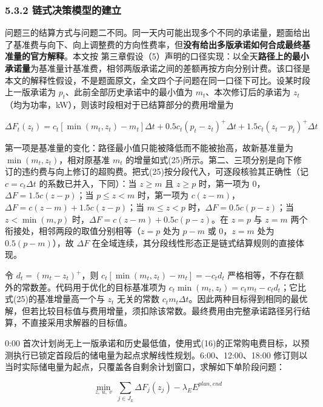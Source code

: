 \documentclass[12pt,a4paper]{ctexart}
\begin{document}
\subsubsection*{5.3.2 链式决策模型的建立}

问题三的结算方式与问题二不同。同一天内可能出现多个不同的承诺量，题面给出了基准费与向下、向上调整费的方向性费率，但\textbf{没有给出多版承诺如何合成最终基准量的官方解释}。本文按 第三章假设（5）声明的口径实现：以全天\textbf{路径上的最小承诺量}为基准量计基准费，相邻两版承诺之间的差额再按方向分别计费。该口径是本文的解释性假设，不是题面原文，全文四个子问题在同一口径下可比。设某时段上一版承诺为 $p_t$、此前全部历史承诺中的最小值为 $m_t$、本次修订后的承诺为 $z_t$（均为功率，kW），则该时段相对于已结算部分的费用增量为

\begin{equation}
\Delta F_t(z_t)=c_t\left[\min(m_t,z_t)-m_t\right]\Delta t+0.5c_t\left(p_t-z_t\right)^{+}\Delta t+1.5c_t\left(z_t-p_t\right)^{+}\Delta t
\end{equation}

第一项是基准量的变化：路径最小值只能被降低而不能被抬高，故新基准量为 $\min(m_t,z_t)$，相对原基准 $m_t$ 的增量如式(25)所示。第二、三项分别是向下修订的违约费与向上修订的超购费。把式(25)按分段代入，可逐段核验其正确性（记 $c=c_t\Delta t$ 的系数已并入，下同）：当 $z\ge m$ 且 $z\ge p$ 时，第一项为 0，$\Delta F=1.5c(z-p)$；当 $p\le z<m$ 时，第一项为 $c(z-m)$，$\Delta F=c(z-m)+1.5c(z-p)$；当 $m\le z<p$ 时，$\Delta F=0.5c(p-z)$；当 $z<\min(m,p)$ 时，$\Delta F=c(z-m)+0.5c(p-z)$。在 $z=p$ 与 $z=m$ 两个衔接处，相邻两段的取值分别相等（$z=p$ 处为 $p-m$ 或 0，$z=m$ 处为 $0.5(p-m)$），故 $\Delta F$ 在全域连续，其分段线性形态正是链式结算规则的直接体现。

令 $d_t=(m_t-z_t)^+$，则 $c_t[\min(m_t,z_t)-m_t]=-c_t d_t$ 严格相等，不存在额外的常数差。代码用于优化的目标基准项为 $c_t\min(m_t,z_t)=c_t m_t-c_t d_t$；它比式(25)的基准增量高一个与 $z_t$ 无关的常数 $c_t m_t\Delta t$。因此两种目标得到相同的最优解，但若比较目标值与费用增量，须扣除该常数。最终费用由完整承诺路径另行结算，不直接采用求解器的目标值。

0:00 首次计划尚无上一版承诺和历史最低值，使用式(16)的正常购电费目标，以预测执行已锁定首段后的储电量为起点求解线性规划。6:00、12:00、18:00 修订则以当时实际储电量为起点，只覆盖各自剩余计划窗口，求解如下单阶段问题：

\begin{equation}
\min_{z,\ u,\ v}\ \sum_{j\in J_k}\Delta F_j(z_j)-\lambda_E E^{plan,end}
\end{equation}
\end{document}
